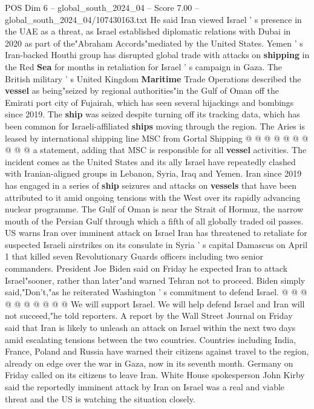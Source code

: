\begin{textsample}{POS Dim 6 – global\_south\_2024\_04 – Score 7.00 – global\_south\_2024\_04/107430163.txt}
He said Iran viewed Israel ' s presence in the UAE as a threat, as Israel established diplomatic relations with Dubai in 2020 as part of the"Abraham Accords"mediated by the United States.
Yemen ' s Iran-backed Houthi group has disrupted global trade with attacks on \textbf{shipping} in the Red \textbf{Sea} for months in retaliation for Israel ' s campaign in Gaza.
The British military ' s United Kingdom \textbf{Maritime} Trade Operations described the \textbf{vessel} as being"seized by regional authorities"in the Gulf of Oman off the Emirati port city of Fujairah, which has seen several hijackings and bombings since 2019.
The \textbf{ship} was seized despite turning off its tracking data, which has been common for Israeli-affiliated \textbf{ships} moving through the region.
The Aries is leased by international shipping line MSC from Gortal Shipping @ @ @ @ @ @ @ @ @ @ a statement, adding that MSC is responsible for all \textbf{vessel} activities.
The incident comes as the United States and its ally Israel have repeatedly clashed with Iranian-aligned groups in Lebanon, Syria, Iraq and Yemen.
Iran since 2019 has engaged in a series of \textbf{ship} seizures and attacks on \textbf{vessels} that have been attributed to it amid ongoing tensions with the West over its rapidly advancing nuclear programme.
The Gulf of Oman is near the Strait of Hormuz, the narrow mouth of the Persian Gulf through which a fifth of all globally traded oil passes.
US warns Iran over imminent attack on Israel Iran has threatened to retaliate for suspected Israeli airstrikes on its consulate in Syria ' s capital Damascus on April 1 that killed seven Revolutionary Guards officers including two senior commanders.
President Joe Biden said on Friday he expected Iran to attack Israel"sooner, rather than later"and warned Tehran not to proceed.
Biden simply said,"Don't,"as he reiterated Washington ' s commitment to defend Israel. @ @ @ @ @ @ @ @ @ @ We will support Israel.
We will help defend Israel and Iran will not succeed,"he told reporters.
A report by the Wall Street Journal on Friday said that Iran is likely to unleash an attack on Israel within the next two days amid escalating tensions between the two countries.
Countries including India, France, Poland and Russia have warned their citizens against travel to the region, already on edge over the war in Gaza, now in its seventh month.
Germany on Friday called on its citizens to leave Iran.
White House spokesperson John Kirby said the reportedly imminent attack by Iran on Israel was a real and viable threat and the US is watching the situation closely.

\end{textsample}
